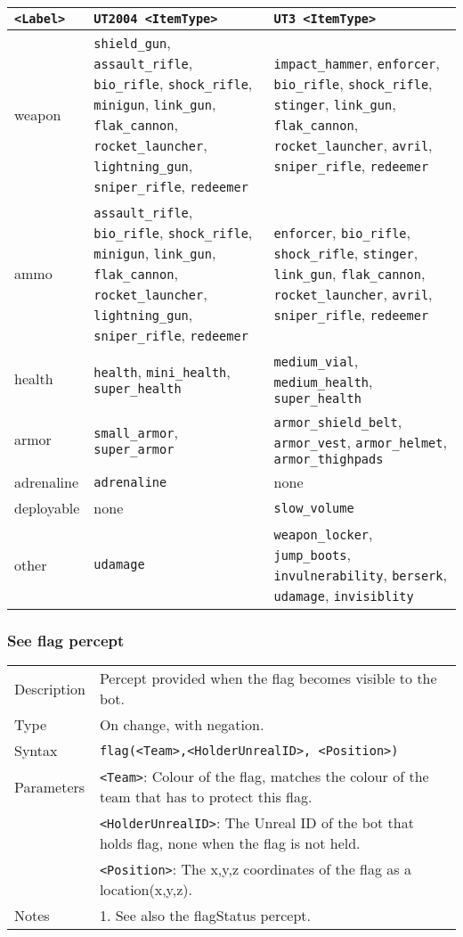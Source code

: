 \documentclass[11pt,a4paper]{article}
\begin{document}
\begin{small}
\begin{tabular}{|p{2cm}|p{6cm}|p{6cm}|}	
	\hline
\verb|<Label>| & \verb|UT2004 <ItemType>| & \verb|UT3 <ItemType>|\\
\hline
weapon &
\verb|shield_gun|, \verb|assault_rifle|, \verb|bio_rifle|, \verb|shock_rifle|, \verb|minigun|, \verb|link_gun|, \verb|flak_cannon|, \verb|rocket_launcher|, \verb|lightning_gun|, \verb|sniper_rifle|, \verb|redeemer| &
\verb|impact_hammer|, \verb|enforcer|, \verb|bio_rifle|, \verb|shock_rifle|, \verb|stinger|, \verb|link_gun|, \verb|flak_cannon|, \verb|rocket_launcher|, \verb|avril|, \verb|sniper_rifle|, \verb|redeemer| \\
ammo &
\verb|assault_rifle|, \verb|bio_rifle|, \verb|shock_rifle|, \verb|minigun|, \verb|link_gun|, \verb|flak_cannon|, \verb|rocket_launcher|, \verb|lightning_gun|, \verb|sniper_rifle|, \verb|redeemer| &
\verb|enforcer|, \verb|bio_rifle|, \verb|shock_rifle|, \verb|stinger|, \verb|link_gun|, \verb|flak_cannon|, \verb|rocket_launcher|, \verb|avril|, \verb|sniper_rifle|, \verb|redeemer| \\
health & \verb|health|, \verb|mini_health|, \verb|super_health| & \verb|medium_vial|, \verb|medium_health|, \verb|super_health|\\
armor & \verb|small_armor|, \verb|super_armor| & \verb|armor_shield_belt|, \verb|armor_vest|, \verb|armor_helmet|, \verb|armor_thighpads|\\
adrenaline & \verb|adrenaline| & none\\
deployable & none & \verb|slow_volume|\\
other & \verb|udamage| & \verb|weapon_locker|, \verb|jump_boots|, \verb|invulnerability|, \verb|berserk|, \verb|udamage|, \verb|invisiblity| \\
 \hline
\end{tabular}
\end{small}


\subsubsection*{See flag percept}
\begin{small}
\begin{tabular}{p{2cm}p{9cm}}
Description & Percept provided when the flag becomes visible to the bot. \\
Type & On change, with negation.\\
Syntax & \verb|flag(<Team>,<HolderUnrealID>, <Position>)|\\
Parameters & 
	\verb|<Team>|: Colour of the flag, matches the colour of the team that has to protect this flag.\\
& \verb|<HolderUnrealID>|: The Unreal ID of the bot that holds flag, none when the flag is not held.\\
& \verb|<Position>|: The x,y,z coordinates of the flag as a location(x,y,z).\\

Notes &
	1.	See also the flagStatus percept.
\end{tabular}
\end{small}
\end{document}
